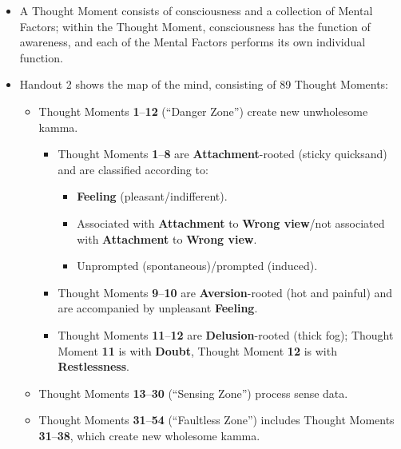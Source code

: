 \begin{itemize}

\item A Thought Moment consists of consciousness and a collection of Mental Factors; within the Thought Moment, consciousness has the function of awareness, and each of the Mental Factors performs its own individual function.

\item Handout 2 shows the map of the mind, consisting of 89 Thought Moments:

\begin{itemize}

\item Thought Moments \textbf{1}--\textbf{12} (“Danger Zone”) create new unwholesome kamma.

\begin{itemize}

\item Thought Moments \textbf{1}--\textbf{8} are \textbf{Attachment}-rooted (sticky quicksand) and are classified according to:

\begin{itemize}

\item \textbf{Feeling} (pleasant/indifferent).

\item Associated with \textbf{Attachment} to \textbf{Wrong view}/not associated with \textbf{Attachment} to \textbf{Wrong view}.

\item Unprompted (spontaneous)/prompted (induced).

\end{itemize}

\item Thought Moments \textbf{9}--\textbf{10} are \textbf{Aversion}-rooted (hot and painful) and are accompanied by unpleasant \textbf{Feeling}.

\item Thought Moments \textbf{11}--\textbf{12} are \textbf{Delusion}-rooted (thick fog); Thought Moment \textbf{11} is with \textbf{Doubt}, Thought Moment \textbf{12} is with \textbf{Restlessness}.

\end{itemize}

\item Thought Moments \textbf{13}--\textbf{30} (“Sensing Zone”) process sense data.

\item Thought Moments \textbf{31}--\textbf{54} (“Faultless Zone”) includes Thought Moments \textbf{31}--\textbf{38}, which create new wholesome kamma.


\end{itemize}
\end{itemize}
